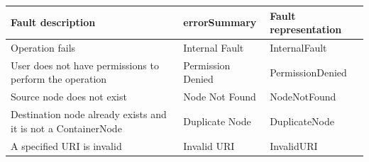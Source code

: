 \documentclass[11pt,a4paper]{ivoa}
\begin{document}
\vspace{3mm}
\begin{tabular}{ p{5cm} l p{4cm} }
\textbf{Fault description} & \textbf{errorSummary} & \textbf{Fault representation} \\
\hline
Operation fails & Internal Fault & InternalFault \\
\hline
User does not have permissions to perform the operation &Permission Denied & PermissionDenied \\
\hline
Source node does not exist & Node Not Found & NodeNotFound \\
\hline
Destination node already exists and it is not a ContainerNode & Duplicate Node & DuplicateNode \\
\hline
A specified URI is invalid & Invalid URI & InvalidURI \\
\hline
\end{tabular}
\vspace{3mm}
\end{document}
